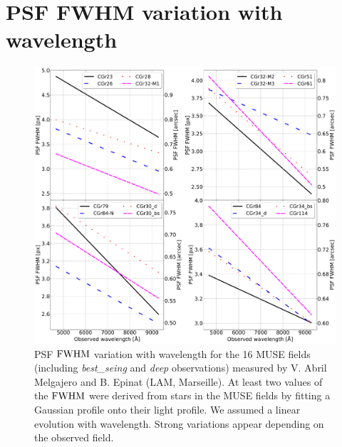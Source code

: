 \clearpage
\section{PSF FWHM variation with wavelength}

\begin{figure}[hbtp]
	\centering
	\includegraphics[width=\linewidth]{../Plots/FWHM_variation_with_lambda.pdf}
	\caption[PSF FWHM variation with wavelength.]{PSF $\rm{FWHM}$ variation with wavelength for the 16 MUSE fields (including \textit{best\_seing} and \textit{deep} observations) measured by V. Abril Melgajero and B. Epinat (LAM, Marseille). At least two values of the $\rm{FWHM}$ were derived from stars in the MUSE fields by fitting a Gaussian profile onto their light profile. We assumed a linear evolution with wavelength. Strong variations appear depending on the observed field.}
	\label{fig:FWHM_var_lambda}
\end{figure}